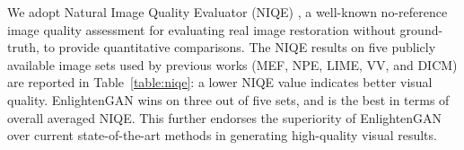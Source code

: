 \documentclass[journal]{IEEEtran}
\begin{document}
\begin{table}[!thb]
\begin{center}
\caption{NIQE scores on the whole testing set (All) and each subset (MEF, LIME, NPE, VV, DICM) respectively. Smaller NIQE indicates more perceptually favored quality.}
\label{table:niqe}
\small
{}
\end{center}

\end{table}








We adopt Natural Image Quality Evaluator (NIQE) \cite{mittal2013making}, a well-known no-reference image quality assessment for evaluating real image restoration without ground-truth, to provide quantitative comparisons. The NIQE results on five publicly available image sets used by previous works (MEF, NPE, LIME, VV, and DICM) are reported in Table~\ref{table:niqe}: a lower NIQE value indicates better visual quality. EnlightenGAN wins on three out of five sets, and is the best in terms of overall averaged NIQE. This further endorses the superiority of EnlightenGAN over current state-of-the-art methods in generating high-quality visual results.
\end{document}
